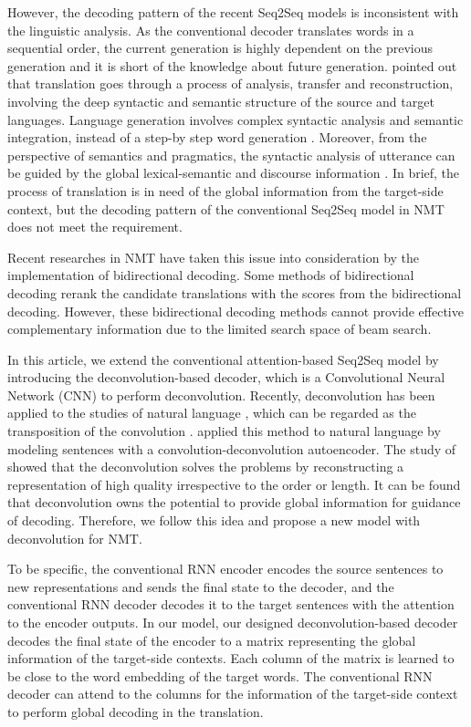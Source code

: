 \documentclass[11pt]{article}
\begin{document}
\begin{CJK}{UTF8}{gbsn}
However, the decoding pattern of the recent Seq2Seq models is inconsistent with the linguistic analysis. As the conventional decoder translates words in a sequential order, the current generation is highly dependent on the previous generation and it is short of the knowledge about future generation. \citet{nida} pointed out that translation goes through a process of analysis, transfer and reconstruction, involving the deep syntactic and semantic structure of the source and target languages. Language generation involves complex syntactic analysis and semantic integration, instead of a step-by step word generation \citep{Frazier}. Moreover, from the perspective of semantics and pragmatics, the syntactic analysis of utterance can be guided by the global lexical-semantic and discourse information \citep{Altmann, Trueswellsemantic, Trueswellverb, Tyler}. In brief, the process of translation is in need of the global information from the target-side context, but the decoding pattern of the conventional Seq2Seq model in NMT does not meet the requirement.

Recent researches in NMT have taken this issue into consideration by the implementation of bidirectional decoding. Some methods of bidirectional decoding \citep{Liu2016Agreement,Cong2017Towards} rerank the candidate translations with the scores from the bidirectional decoding. However, these bidirectional decoding methods cannot provide effective complementary information due to the limited search space of beam search.



In this article, we extend the conventional attention-based Seq2Seq model by introducing the deconvolution-based decoder, which is a Convolutional Neural Network (CNN) to perform deconvolution. Recently, deconvolution has been applied to the studies of natural language \citep{deconvolution,deconvseq}, which can be regarded as the transposition of the convolution \citep{FCN, deconv_ss}. \citet{deconvolution} applied this method to natural language by modeling sentences with a convolution-deconvolution autoencoder. The study of \citet{deconvolution} showed that the deconvolution solves the problems by reconstructing a representation of high quality irrespective to the order or length. It can be found that deconvolution owns the potential to provide global information for guidance of decoding. Therefore, we follow this idea and propose a new model with deconvolution for NMT.

To be specific, the conventional RNN encoder encodes the source sentences to new representations and sends the final state to the decoder, and the conventional RNN decoder decodes it to the target sentences with the attention to the encoder outputs. In our model, our designed deconvolution-based decoder decodes the final state of the encoder to a matrix representing the global information of the target-side contexts. Each column of the matrix is learned to be close to the word embedding of the target words. The conventional RNN decoder can attend to the columns for the information of the target-side context to perform global decoding in the translation.


\end{CJK}
\end{document}
